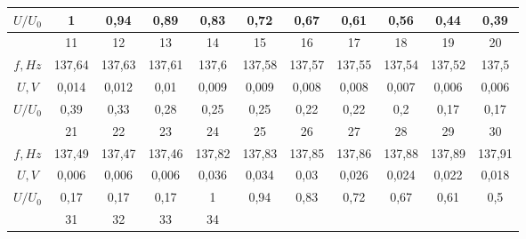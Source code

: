 \documentclass[a4paper, 12pt]{article}%
\begin{document}
\begin{enumerate}
\begin{center}
\begin{tabular}{|c|c|c|c|c|cccccc}
$U/U_0$ & 1      & 0,94   & 0,89   & 0,83   & \multicolumn{1}{c|}{0,72}   & \multicolumn{1}{c|}{0,67}   & \multicolumn{1}{c|}{0,61}   & \multicolumn{1}{c|}{0,56}   & \multicolumn{1}{c|}{0,44}   & \multicolumn{1}{c|}{0,39}   \\ \hline \hline
        & 11     & 12     & 13     & 14     & \multicolumn{1}{c|}{15}     & \multicolumn{1}{c|}{16}     & \multicolumn{1}{c|}{17}     & \multicolumn{1}{c|}{18}     & \multicolumn{1}{c|}{19}     & \multicolumn{1}{c|}{20}     \\ \hline
$f, Hz$ & 137,64 & 137,63 & 137,61 & 137,6  & \multicolumn{1}{c|}{137,58} & \multicolumn{1}{c|}{137,57} & \multicolumn{1}{c|}{137,55} & \multicolumn{1}{c|}{137,54} & \multicolumn{1}{c|}{137,52} & \multicolumn{1}{c|}{137,5}  \\ \hline
$U, V$  & 0,014  & 0,012  & 0,01   & 0,009  & \multicolumn{1}{c|}{0,009}  & \multicolumn{1}{c|}{0,008}  & \multicolumn{1}{c|}{0,008}  & \multicolumn{1}{c|}{0,007}  & \multicolumn{1}{c|}{0,006}  & \multicolumn{1}{c|}{0,006}  \\ \hline
$U/U_0$ & 0,39   & 0,33   & 0,28   & 0,25   & \multicolumn{1}{c|}{0,25}   & \multicolumn{1}{c|}{0,22}   & \multicolumn{1}{c|}{0,22}   & \multicolumn{1}{c|}{0,2}    & \multicolumn{1}{c|}{0,17}   & \multicolumn{1}{c|}{0,17}   \\ \hline \hline
        & 21     & 22     & 23     & 24     & \multicolumn{1}{c|}{25}     & \multicolumn{1}{c|}{26}     & \multicolumn{1}{c|}{27}     & \multicolumn{1}{c|}{28}     & \multicolumn{1}{c|}{29}     & \multicolumn{1}{c|}{30}     \\ \hline
$f, Hz$ & 137,49 & 137,47 & 137,46 & 137,82 & \multicolumn{1}{c|}{137,83} & \multicolumn{1}{c|}{137,85} & \multicolumn{1}{c|}{137,86} & \multicolumn{1}{c|}{137,88} & \multicolumn{1}{c|}{137,89} & \multicolumn{1}{c|}{137,91} \\ \hline
$U, V$  & 0,006  & 0,006  & 0,006  & 0,036  & \multicolumn{1}{c|}{0,034}  & \multicolumn{1}{c|}{0,03}   & \multicolumn{1}{c|}{0,026}  & \multicolumn{1}{c|}{0,024}  & \multicolumn{1}{c|}{0,022}  & \multicolumn{1}{c|}{0,018}  \\ \hline
$U/U_0$ & 0,17   & 0,17   & 0,17   & 1      & \multicolumn{1}{c|}{0,94}   & \multicolumn{1}{c|}{0,83}   & \multicolumn{1}{c|}{0,72}   & \multicolumn{1}{c|}{0,67}   & \multicolumn{1}{c|}{0,61}   & \multicolumn{1}{c|}{0,5}    \\ \hline \hline
        & 31     & 32     & 33     & 34     &                             &                             &                             &                             &                             &                             \\ \cline{1-5}

\end{tabular}
\end{center}
\end{enumerate}
\end{document}
